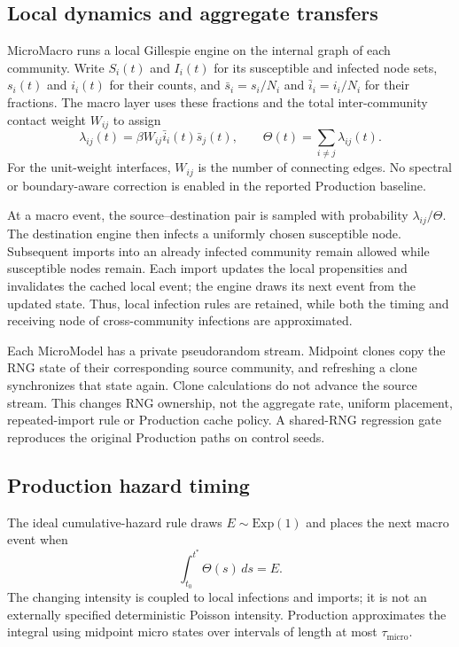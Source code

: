 \documentclass[a4paper,fleqn]{cas-sc}
\begin{document}
\subsection{Local dynamics and aggregate transfers}
\label{sec:two_scale_simulator}

MicroMacro runs a local Gillespie engine on the internal graph of each community. Write $S_i(t)$ and $I_i(t)$ for its susceptible and infected node sets, $s_i(t)$ and $i_i(t)$ for their counts, and $\bar s_i=s_i/N_i$ and $\bar i_i=i_i/N_i$ for their fractions. The macro layer uses these fractions and the total inter-community contact weight $W_{ij}$ to assign
\[
\lambda_{ij}(t)=\beta W_{ij}\bar i_i(t)\bar s_j(t),
\qquad
\Theta(t)=\sum_{i\ne j}\lambda_{ij}(t).
\]
For the unit-weight interfaces, $W_{ij}$ is the number of connecting edges. No spectral or boundary-aware correction is enabled in the reported Production baseline.

At a macro event, the source--destination pair is sampled with probability $\lambda_{ij}/\Theta$. The destination engine then infects a uniformly chosen susceptible node. Subsequent imports into an already infected community remain allowed while susceptible nodes remain. Each import updates the local propensities and invalidates the cached local event; the engine draws its next event from the updated state. Thus, local infection rules are retained, while both the timing and receiving node of cross-community infections are approximated.

Each MicroModel has a private pseudorandom stream. Midpoint clones copy the RNG state of their corresponding source community, and refreshing a clone synchronizes that state again. Clone calculations do not advance the source stream. This changes RNG ownership, not the aggregate rate, uniform placement, repeated-import rule or Production cache policy. A shared-RNG regression gate reproduces the original Production paths on control seeds.

\subsection{Production hazard timing}

The ideal cumulative-hazard rule draws $E\sim\mathrm{Exp}(1)$ and places the next macro event when
\[
\int_{t_0}^{t^\ast}\Theta(s)\,ds=E.
\]
The changing intensity is coupled to local infections and imports; it is not an externally specified deterministic Poisson intensity. Production approximates the integral using midpoint micro states over intervals of length at most $\tau_{\mathrm{micro}}$.
\end{document}
